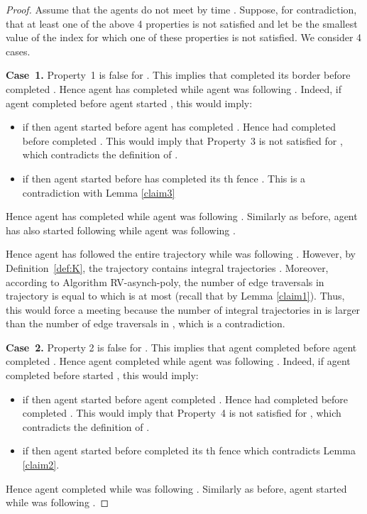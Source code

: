 \documentclass [11pt] {article}
\begin{document}
\begin{proof}
{Assume that the agents do not meet by time .}
Suppose, for contradiction, that at least one of the above 4 properties is not satisfied and let  be the smallest value of the index  for which one of these properties is not satisfied. We consider 4 cases.

{\bf Case~1.} Property~1 is false for . This implies that  completed its border  before  completed . Hence agent  has completed  while agent  was following 
. Indeed, if agent  completed  before agent  started , this would imply:
\begin{itemize}

\item if  then agent  started  before agent  has completed . Hence  had completed  before  completed . This would imply that Property~3 is not satisfied for , which contradicts the definition of . 

\item if  then agent  started  before  has completed its th fence . {This is a contradiction with Lemma \ref{claim3}}



\end{itemize}

Hence agent  has completed  while agent  was following 
. Similarly as before, agent  has also started following  while agent  was following . 

Hence agent  has followed the entire trajectory  while  was following . 
However, by Definition~\ref{def:K}, the trajectory  contains  integral trajectories . Moreover, according to Algorithm RV-asynch-poly, the number of {edge traversals} in trajectory  is equal to  which is at most  (recall that  by Lemma \ref{claim1}). Thus, this would force a meeting because the number of integral trajectories  in  is larger than the number of {edge traversals} in , which is a contradiction.  



{\bf Case~2.} Property 2 is false for . This implies that agent  completed  before agent  completed . Hence agent  completed  while agent  was following 
. Indeed, if agent  completed  before  started , this would imply:
\begin{itemize}
\item if  then agent  started  before agent  completed . Hence  had completed  before  completed . This would imply that Property~4 is not satisfied for , which contradicts the definition of . 

\item if  then agent  started  before  completed its th fence   which contradicts Lemma \ref{claim2}.
\end{itemize}
Hence agent  completed  while  was following . Similarly as before, agent  started  while  was
following .


\end{proof}
\end{document}
